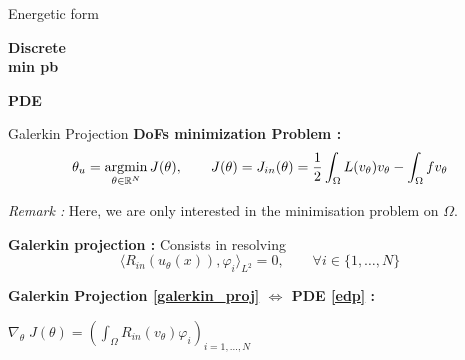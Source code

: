 \begin{frame}{Energetic form}
\begin{center}
\begin{tcolorbox}
			\vspace{5pt}
			
			\begin{minipage}{0.1\linewidth}
				\centering
				\textbf{Discrete} \\
				\textbf{min pb}
			\end{minipage} \; \hspace{165pt} \; \begin{minipage}{0.1\linewidth}
				\centering
				\textbf{PDE}
			\end{minipage}
		\end{tcolorbox}
	\end{center}
\end{frame}

\begin{frame}{Galerkin Projection}
	\textbf{DoFs minimization Problem :}
	\begin{equation}
		\displaystyle \theta_u=\operatorname*{argmin}_{\theta\in\mathbb{R}^N} J(\theta), \qquad J(\theta)=J_{in}(\theta)=\frac{1}{2}\int_\Omega L(v_\theta)v_\theta - \int_\Omega fv_\theta \label{minpb_galerkin_discret}
	\end{equation}
%		
	
	\footnotesize	
	\textit{Remark :} Here, we are only interested in the minimisation problem on $\Omega$.
	
	\normalsize	
	
	\textbf{Galerkin projection :} Consists in resolving
	\begin{equation}
		\langle R_{in}(u_\theta(x)),\varphi_i\rangle_{L^2}=0, \qquad \forall i\in\{1,\dots,N\}\label{galerkin_proj}
	\end{equation}

	\footnotesize
	\begin{center}
		\begin{tcolorbox}[
			colback=white, %
			colframe=other, %
			arc=2mm, %
			boxrule=0.5pt, %
			breakable, enhanced jigsaw,
			width=\linewidth
			]
			
			\textbf{Galerkin Projection \eqref{galerkin_proj} $\Leftrightarrow$ PDE \eqref{edp} :}
			
			\centering
			$\nabla_\theta \; J(\theta)=\left(\int_\Omega R_{in}(v_\theta)\varphi_i\right)_{i=1,\dots,N} \qquad $  
			

\end{tcolorbox}
\end{center}
\end{frame}

